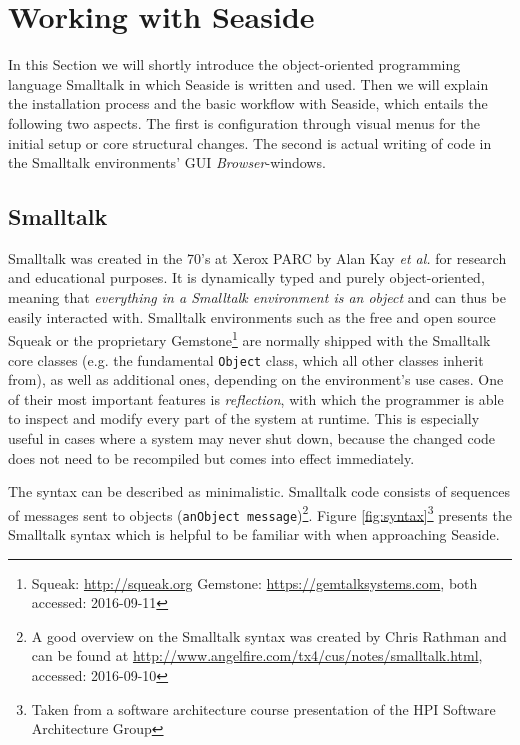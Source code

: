 \documentclass[a4paper,12pt,pagesize,headsepline,oribibl,titlepage]{scrartcl}
\begin{document}
\section{Working with Seaside}
\label{sec:workflow}

In this Section we will shortly introduce the object-oriented programming language Smalltalk in which Seaside is written and used. Then we will explain the installation process and the basic workflow with Seaside, which entails the following two aspects. The first is configuration through visual menus for the initial setup or core structural changes. The second is actual writing of code in the Smalltalk environments' GUI \emph{Browser}-windows\cite{perscheid2008introduction}.


\subsection{Smalltalk}

Smalltalk was created in the 70's at Xerox PARC by Alan Kay \emph{et al.} for research and educational purposes. It is dynamically typed and purely object-oriented, meaning that \emph{everything in a Smalltalk environment is an object} and can thus be easily interacted with. Smalltalk environments such as the free and open source Squeak or the proprietary Gemstone\footnote{Squeak: \url{http://squeak.org} Gemstone: \url{https://gemtalksystems.com}, both accessed: 2016-09-11} are normally shipped with the Smalltalk core classes (e.g. the fundamental \texttt{Object} class, which all other classes inherit from), as well as additional ones, depending on the environment's use cases. One of their most important features is \emph{reflection}, with which the programmer is able to inspect and modify every part of the system at runtime. This is especially useful in cases where a system may never shut down, because the changed code does not need to be recompiled but comes into effect immediately. 

The syntax can be described as minimalistic. Smalltalk code consists of sequences of messages sent to objects (\texttt{anObject message})\footnote{A good overview on the Smalltalk syntax was created by Chris Rathman and can be found at \url{http://www.angelfire.com/tx4/cus/notes/smalltalk.html}, accessed: 2016-09-10}. Figure \ref{fig:syntax}\footnote{Taken from a software architecture course presentation of the HPI Software Architecture Group} presents the Smalltalk syntax which is helpful to be familiar with when approaching Seaside.  
\end{document}
